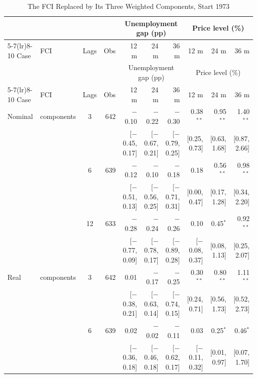 \begingroup\scriptsize\setlength{\tabcolsep}{0.9pt}
\begin{longtable}{llcrrrrrrr}
\caption{The FCI Replaced by Its Three Weighted Components, Start 1973}\label{tab:appR4b}\\
\toprule
 & & & & \multicolumn{3}{c}{Unemployment gap (pp)} & \multicolumn{3}{c}{Price level (\%)}\\ \cmidrule(lr){5-7}\cmidrule(lr){8-10}
Case & FCI & Lags & Obs & 12 m & 24 m & 36 m & 12 m & 24 m & 36 m\\
\midrule\endfirsthead
\toprule
 & & & & \multicolumn{3}{c}{Unemployment gap (pp)} & \multicolumn{3}{c}{Price level (\%)}\\ \cmidrule(lr){5-7}\cmidrule(lr){8-10}
Case & FCI & Lags & Obs & 12 m & 24 m & 36 m & 12 m & 24 m & 36 m\\
\midrule\endhead
\bottomrule\endfoot
Nominal & components & 3 & 642 & $-$0.10 & $-$0.22 & $-$0.30 & 0.38$^{**}$ & 0.95$^{**}$ & 1.40$^{**}$\\
 & & & & {\scriptsize [$-$0.45, 0.17]} & {\scriptsize [$-$0.67, 0.21]} & {\scriptsize [$-$0.79, 0.25]} & {\scriptsize [0.25, 0.73]} & {\scriptsize [0.63, 1.68]} & {\scriptsize [0.87, 2.66]}\\
 &  & 6 & 639 & $-$0.12 & $-$0.10 & $-$0.18 & 0.18 & 0.56$^{**}$ & 0.98$^{**}$\\
 & & & & {\scriptsize [$-$0.51, 0.13]} & {\scriptsize [$-$0.56, 0.25]} & {\scriptsize [$-$0.71, 0.31]} & {\scriptsize [0.00, 0.47]} & {\scriptsize [0.17, 1.28]} & {\scriptsize [0.34, 2.20]}\\
 &  & 12 & 633 & $-$0.28 & $-$0.24 & $-$0.26 & 0.10 & 0.45$^{*}$ & 0.92$^{**}$\\
 & & & & {\scriptsize [$-$0.77, 0.09]} & {\scriptsize [$-$0.78, 0.17]} & {\scriptsize [$-$0.89, 0.28]} & {\scriptsize [$-$0.08, 0.37]} & {\scriptsize [0.08, 1.13]} & {\scriptsize [0.25, 2.07]}\\
\addlinespace
Real & components & 3 & 642 & 0.01 & $-$0.17 & $-$0.25 & 0.30$^{**}$ & 0.80$^{**}$ & 1.11$^{**}$\\
 & & & & {\scriptsize [$-$0.38, 0.21]} & {\scriptsize [$-$0.63, 0.14]} & {\scriptsize [$-$0.74, 0.15]} & {\scriptsize [0.24, 0.71]} & {\scriptsize [0.56, 1.73]} & {\scriptsize [0.52, 2.73]}\\
 &  & 6 & 639 & 0.02 & $-$0.02 & $-$0.11 & 0.03 & 0.25$^{*}$ & 0.46$^{*}$\\
 & & & & {\scriptsize [$-$0.36, 0.18]} & {\scriptsize [$-$0.46, 0.18]} & {\scriptsize [$-$0.62, 0.17]} & {\scriptsize [$-$0.11, 0.32]} & {\scriptsize [0.01, 0.97]} & {\scriptsize [0.07, 1.70]}\\

\end{longtable}
